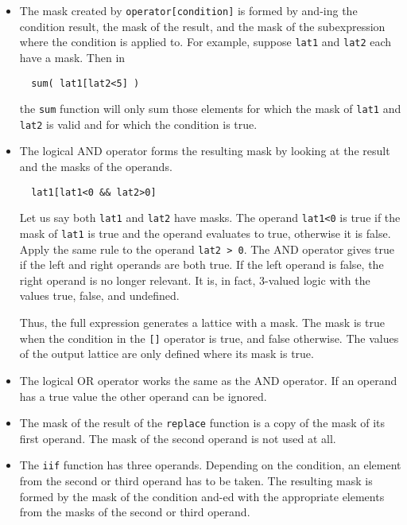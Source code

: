 \begin{itemize}
\item
The mask created by \texttt{operator[condition]} is formed by and-ing the
condition result, the mask of the result, and the mask of the subexpression
where the condition is applied to.   For example, suppose \texttt{lat1} and
\texttt{lat2} each  have a mask. Then in
\begin{verbatim}
  sum( lat1[lat2<5] )
\end{verbatim}
the \texttt{sum} function will only sum those elements for which
the mask of \texttt{lat1} and \texttt{lat2} is valid and for which
the condition is true.

\item
The logical AND operator forms the resulting mask by looking at the
result and the masks of the operands.  

\begin{verbatim}
  lat1[lat1<0 && lat2>0]
\end{verbatim}
Let us say both {\tt lat1} and {\tt lat2} have masks.  The operand
{\tt lat1<0} is true if the mask of {\tt lat1} is true and the
operand evaluates to true, otherwise it is false.  Apply the same
rule to the operand {\tt lat2 > 0}.  The AND operator gives true if
the left and right operands are both true.  If the left operand
is false, the right operand is no longer relevant.  It is, in
fact, 3-valued logic with the values true, false, and undefined. 

\medskip\noindent Thus, the full expression generates a lattice with a mask.
The mask is true when the condition in the {\tt []} operator
is true, and false otherwise.  The values of the output lattice are only
defined where its mask is true.

\item
The logical OR operator works the same as the AND operator.  If
an operand has a true value the other operand can be ignored.

\item
The mask of the result of the \texttt{replace} function is a copy
of the mask of its first operand. The mask of the second operand is
not used at all.

\item
The \texttt{iif} function has three operands. Depending on the
condition, an element from the second or third operand has to be taken.
The resulting mask is formed by the mask of the condition and-ed
with the appropriate elements from the masks of the second or third
operand.


\end{itemize}
